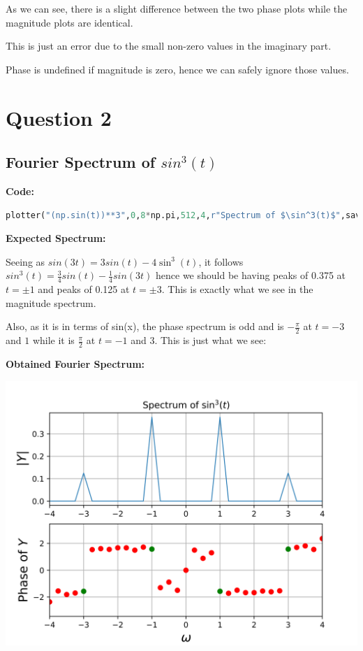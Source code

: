 \documentclass[12pt]{article}
\begin{document}
As we can see, there is a slight difference between the two phase plots while the magnitude plots are identical. 

This is just an error due to the small non-zero values in the imaginary part. 

Phase is undefined if magnitude is zero, hence we can safely ignore those values.
\pagebreak
\section{Question 2}

\subsection{Fourier Spectrum of $sin^3(t)$}

\textbf{Code:}
\begin{lstlisting}[language=Python]
plotter("(np.sin(t))**3",0,8*np.pi,512,4,r"Spectrum of $\sin^3(t)$",save=True,fignum=5)
\end{lstlisting}

\textbf{Expected Spectrum:}

Seeing as $sin(3t)=3sin(t)-4\sin^3(t)$, it follows $sin^3(t)=\frac{3}{4}sin(t)-\frac{1}{4}sin(3t)$ hence we should be having peaks of 0.375 at $t = \pm 1$ and peaks of 0.125 at $t = \pm 3$. 
This is exactly what we see in the magnitude spectrum.

Also, as it is in terms of sin(x), the phase spectrum is odd and is $-\frac{\pi}{2}$ at $t=-3$ and $1$ while it is $\frac{\pi}{2}$ at $t=-1$ and $3$. This is just what we see:

\textbf{Obtained Fourier Spectrum:}

\begin{center}
    \includegraphics[scale=1]{images/fig5.png}
\end{center}
\end{document}
